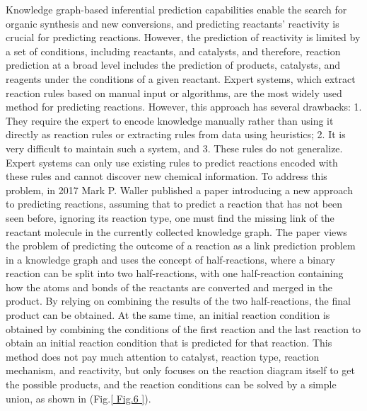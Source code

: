 \documentclass[%
 aip,
 jmp,%
 amsmath,amssymb,
 reprint,%
]{revtex4-2}
\begin{document}
Knowledge graph-based inferential prediction capabilities enable the search for organic synthesis and new conversions, and predicting reactants' reactivity is crucial for predicting reactions\cite{coley2019graph}. However, the prediction of reactivity is limited by a set of conditions, including reactants, and catalysts, and therefore, reaction prediction at a broad level includes the prediction of products, catalysts, and reagents under the conditions of a given reactant. Expert systems, which extract reaction rules based on manual input or algorithms, are the most widely used method for predicting reactions\cite{chen2009no, gasteiger1987new, marcou2015expert, patel2020savi}. However, this approach has several drawbacks: 1. They require the expert to encode knowledge manually rather than using it directly as reaction rules or extracting rules from data using heuristics; 2. It is very difficult to maintain such a system, and 3. These rules do not generalize. Expert systems can only use existing rules to predict reactions encoded with these rules and cannot discover new chemical information. To address this problem, in 2017 Mark P. Waller published a paper introducing a new approach to predicting reactions, assuming that to predict a reaction that has not been seen before, ignoring its reaction type, one must find the missing link of the reactant molecule in the currently collected knowledge graph\cite{segler2017modelling}. The paper views the problem of predicting the outcome of a reaction as a link prediction problem in a knowledge graph and uses the concept of half-reactions, where a binary reaction can be split into two half-reactions, with one half-reaction containing how the atoms and bonds of the reactants are converted and merged in the product. By relying on combining the results of the two half-reactions, the final product can be obtained. At the same time, an initial reaction condition is obtained by combining the conditions of the first reaction and the last reaction to obtain an initial reaction condition that is predicted for that reaction. This method does not pay much attention to catalyst, reaction type, reaction mechanism, and reactivity, but only focuses on the reaction diagram itself to get the possible products, and the reaction conditions can be solved by a simple union, as shown in (Fig.\ref{ Fig.6 }).
\end{document}
